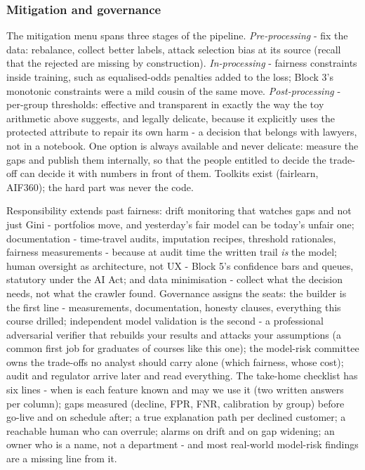 \documentclass[11pt,a4paper]{article}
\begin{document}
\subsubsection{Mitigation and governance}
The mitigation menu spans three stages of the pipeline.
\emph{Pre-processing} - fix the data: rebalance, collect better labels,
attack selection bias at its source (recall that the rejected are
missing by construction). \emph{In-processing} - fairness constraints
inside training, such as equalised-odds penalties added to the loss;
Block 3's monotonic constraints were a mild cousin of the same move.
\emph{Post-processing} - per-group thresholds: effective and
transparent in exactly the way the toy arithmetic above suggests, and
legally delicate, because it explicitly uses the protected attribute to
repair its own harm - a decision that belongs with lawyers, not in a
notebook. One option is always available and never delicate: measure
the gaps and publish them internally, so that the people entitled to
decide the trade-off can decide it with numbers in front of them.
Toolkits exist (fairlearn, AIF360); the hard part was never the code.

Responsibility extends past fairness: drift monitoring that watches gaps
and not just Gini - portfolios move, and yesterday's fair model can be
today's unfair one; documentation - time-travel audits, imputation
recipes, threshold rationales, fairness measurements - because at audit
time the written trail \emph{is} the model; human oversight as
architecture, not UX - Block 5's confidence bars and queues, statutory
under the AI Act; and data minimisation - collect what the decision
needs, not what the crawler found. Governance assigns the seats: the
builder is the first line - measurements, documentation, honesty
clauses, everything this course drilled; independent model validation
is the second - a professional adversarial verifier that rebuilds your
results and attacks your assumptions (a common first job for graduates
of courses like this one); the model-risk committee owns the
trade-offs no analyst should carry alone (which fairness, whose cost);
audit and regulator arrive later and read everything. The take-home
checklist has six lines - when is each feature known and may we use it
(two written answers per column); gaps measured (decline, FPR, FNR,
calibration by group) before go-live and on schedule after; a true
explanation path per declined customer; a reachable human who can
overrule; alarms on drift and on gap widening; an owner who is a name,
not a department - and most real-world model-risk findings are a
missing line from it.
\end{document}
